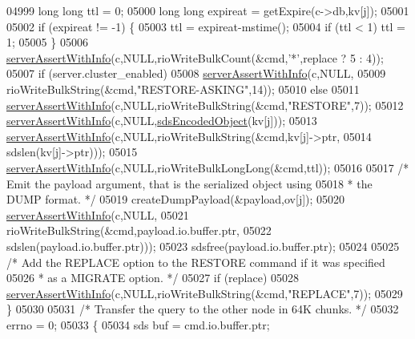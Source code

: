\begin{DoxyCode}
{{{{{{{{{{{{{{{{{{{{{{{{{{{{{{{{{{{{{{{{{{{{{{{{{{{{{{{{{{{{{{{{{{{{{{{{{{{{{{{{{{{{{{{{{{{{{{{{{{{{{{{{{{{04999         \textcolor{keywordtype}{long} \textcolor{keywordtype}{long} ttl = 0;
05000         \textcolor{keywordtype}{long} \textcolor{keywordtype}{long} expireat = getExpire(c->db,kv[j]);
05001 
05002         \textcolor{keywordflow}{if} (expireat != -1) \{
05003             ttl = expireat-mstime();
05004             \textcolor{keywordflow}{if} (ttl < 1) ttl = 1;
05005         \}
05006         \hyperlink{server_8h_a7308f76cbff9a8d3797fe78190b91282}{serverAssertWithInfo}(c,NULL,rioWriteBulkCount(&cmd,\textcolor{stringliteral}{'*'},replace ? 5 : 4));
05007         \textcolor{keywordflow}{if} (server.cluster\_enabled)
05008             \hyperlink{server_8h_a7308f76cbff9a8d3797fe78190b91282}{serverAssertWithInfo}(c,NULL,
05009                 rioWriteBulkString(&cmd,\textcolor{stringliteral}{"RESTORE-ASKING"},14));
05010         \textcolor{keywordflow}{else}
05011             \hyperlink{server_8h_a7308f76cbff9a8d3797fe78190b91282}{serverAssertWithInfo}(c,NULL,rioWriteBulkString(&cmd,\textcolor{stringliteral}{"RESTORE"},7));
05012         \hyperlink{server_8h_a7308f76cbff9a8d3797fe78190b91282}{serverAssertWithInfo}(c,NULL,\hyperlink{server_8h_afcfb5bd97af52d1dbce331745cae030c}{sdsEncodedObject}(kv[j]));
05013         \hyperlink{server_8h_a7308f76cbff9a8d3797fe78190b91282}{serverAssertWithInfo}(c,NULL,rioWriteBulkString(&cmd,kv[j]->ptr,
05014                 sdslen(kv[j]->ptr)));
05015         \hyperlink{server_8h_a7308f76cbff9a8d3797fe78190b91282}{serverAssertWithInfo}(c,NULL,rioWriteBulkLongLong(&cmd,ttl));
05016 
05017         \textcolor{comment}{/* Emit the payload argument, that is the serialized object using}
05018 \textcolor{comment}{         * the DUMP format. */}
05019         createDumpPayload(&payload,ov[j]);
05020         \hyperlink{server_8h_a7308f76cbff9a8d3797fe78190b91282}{serverAssertWithInfo}(c,NULL,
05021             rioWriteBulkString(&cmd,payload.io.buffer.ptr,
05022                                sdslen(payload.io.buffer.ptr)));
05023         sdsfree(payload.io.buffer.ptr);
05024 
05025         \textcolor{comment}{/* Add the REPLACE option to the RESTORE command if it was specified}
05026 \textcolor{comment}{         * as a MIGRATE option. */}
05027         \textcolor{keywordflow}{if} (replace)
05028             \hyperlink{server_8h_a7308f76cbff9a8d3797fe78190b91282}{serverAssertWithInfo}(c,NULL,rioWriteBulkString(&cmd,\textcolor{stringliteral}{"REPLACE"},7));
05029     \}
05030 
05031     \textcolor{comment}{/* Transfer the query to the other node in 64K chunks. */}
05032     errno = 0;
05033     \{
05034         sds buf = cmd.io.buffer.ptr;
}}}}}}}}}}}}}}}}}}}}}}}}}}}}}}}}}}}}}}}}}}}}}}}}}}}}}}}}}}}}}}}}}}}}}}}}}}}}}}}}}}}}}}}}}}}}}}}}}}}}}}}}}}}
\end{DoxyCode}
